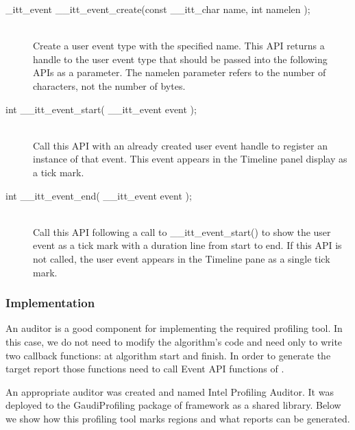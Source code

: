 \begin{description}
\item[\_itt\_event \_\_itt\_event\_create(const \_\_itt\_char \*name, int namelen );] \hfill \\
Create a user event type with the specified name. This API returns a handle to the user event type that should be 
passed into the following APIs as a parameter. The namelen parameter refers to the number of characters, 
not the number of bytes.

\item[int \_\_itt\_event\_start( \_\_itt\_event event );] \hfill \\
Call this API with an already created user event handle to register an instance of that event. This event appears 
in the Timeline panel display as a tick mark.

\item[int \_\_itt\_event\_end( \_\_itt\_event event );] \hfill \\
Call this API following a call to \_\_itt\_event\_start() to show the user event as a tick mark with a duration line 
from start to end. If this API is not called, the user event appears in the Timeline pane as a single tick mark.
\end{description}

\subsubsection{Implementation}

An auditor is a good component for implementing the required profiling tool. In
this case, we do not need to modify the algorithm's code and need only to write
two callback functions: at algorithm start and finish. In order to generate the
target report those functions need to call Event API functions of \amp.

An appropriate auditor was created and named \gaudi Intel Profiling Auditor. It
was deployed to the GaudiProfiling package of \gaudi framework as a shared
library. Below we show how this profiling tool marks regions and what reports
can be generated.

